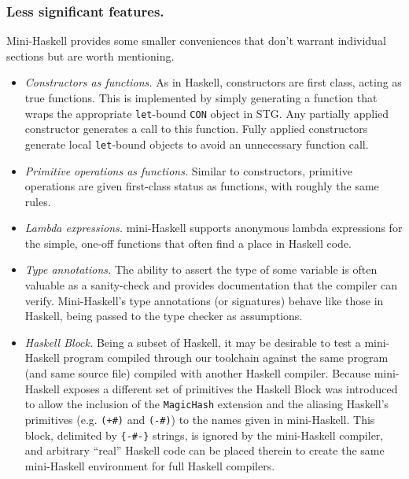 \documentclass{llncs}
\begin{document}
\vspace{-0.1in}
\subsubsection{Less significant features.}
Mini-Haskell provides some smaller conveniences that don't warrant individual
sections but are worth mentioning.
\begin{itemize}
\item \emph{Constructors as functions.}
  As in Haskell, constructors are first class, acting as true functions.  This
  is implemented by simply generating a function that wraps the appropriate
  \texttt{let}-bound \texttt{CON} object in STG.  
%
  Any partially applied
  constructor generates a call to this function.  Fully applied constructors
  generate local \texttt{let}-bound objects to avoid an unnecessary function
  call.

\item \emph{Primitive operations as functions.}
  Similar to constructors, primitive operations are given first-class status as
  functions, with roughly the same rules.  %

\item \emph{Lambda expressions.}
  mini-Haskell supports anonymous lambda expressions for the simple, one-off
  functions that often find a place in Haskell code.%

\item \emph{Type annotations.}  The ability to assert the type of some
  variable is often valuable as a sanity-check and provides documentation that
  the compiler can verify.  Mini-Haskell's type annotations (or signatures)
  behave like those in Haskell, being passed to the type checker as %
  assumptions.

\item \emph{Haskell Block.}
  Being a subset of Haskell, it may be desirable to test a mini-Haskell program
  compiled through our toolchain against the same program (and same source file)
  compiled with another Haskell compiler.  Because mini-Haskell exposes a
  different set of primitives the Haskell Block was introduced to allow the
  inclusion of the \texttt{MagicHash} extension and the aliasing Haskell's
  primitives (e.g. \texttt{(+\#)} and \texttt{(-\#)}) to the names given in
  mini-Haskell.  This block, delimited by \texttt{\{-\#-\}} strings, is ignored
  by the mini-Haskell compiler, and arbitrary ``real'' Haskell code can be
  placed therein to create the same mini-Haskell environment for full Haskell
  compilers.

\end{itemize}
\end{document}
